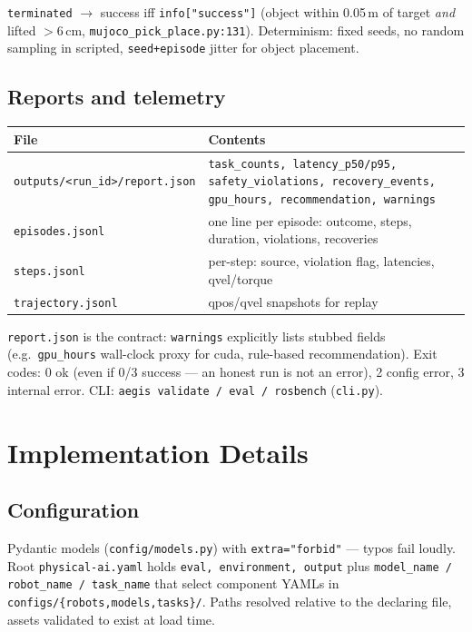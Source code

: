\documentclass[11pt,a4paper]{article}
\begin{document}
\texttt{terminated} $\rightarrow$ success iff \texttt{info["success"]} (object within 0.05\,m of target \textit{and} lifted $>$6\,cm, \texttt{mujoco\_pick\_place.py:131}). Determinism: fixed seeds, no random sampling in scripted, \texttt{seed+episode} jitter for object placement.

\subsection{Reports and telemetry}
\begin{center}
\small
\begin{tabular}{ll}
\toprule
File & Contents \\
\midrule
\texttt{outputs/<run\_id>/report.json} & \texttt{task\_counts, latency\_p50/p95, safety\_violations, recovery\_events, gpu\_hours, recommendation, warnings} \\
\texttt{episodes.jsonl} & one line per episode: outcome, steps, duration, violations, recoveries \\
\texttt{steps.jsonl} & per-step: source, violation flag, latencies, qvel/torque \\
\texttt{trajectory.jsonl} & qpos/qvel snapshots for replay \\
\bottomrule
\end{tabular}
\end{center}

\texttt{report.json} is the contract: \texttt{warnings} explicitly lists stubbed fields (e.g.\ \texttt{gpu\_hours} wall-clock proxy for cuda, rule-based recommendation). Exit codes: 0 ok (even if 0/3 success — an honest run is not an error), 2 config error, 3 internal error. CLI: \texttt{aegis validate / eval / rosbench} (\texttt{cli.py}).

\section{Implementation Details}

\subsection{Configuration}
Pydantic models (\texttt{config/models.py}) with \texttt{extra="forbid"} — typos fail loudly. Root \texttt{physical-ai.yaml} holds \texttt{eval, environment, output} plus \texttt{model\_name / robot\_name / task\_name} that select component YAMLs in \texttt{configs/\{robots,models,tasks\}/}. Paths resolved relative to the declaring file, assets validated to exist at load time.
\end{document}
